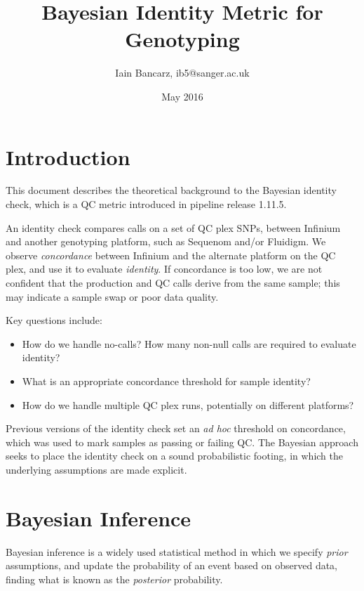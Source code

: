 \documentclass{article}
\begin{document}
\title{Bayesian Identity Metric for Genotyping}
\author{Iain Bancarz, ib5@sanger.ac.uk }
\date{May 2016}
\maketitle


\section{Introduction}

This document describes the theoretical background to the Bayesian identity check, which is a QC metric introduced in pipeline release 1.11.5.

An identity check compares calls on a set of QC plex SNPs, between Infinium and another genotyping platform, such as Sequenom and/or Fluidigm. We observe \emph{concordance} between Infinium and the alternate platform on the QC plex, and use it to evaluate \emph{identity}. If concordance is too low, we are not confident that the production and QC calls derive from the same sample; this may indicate a sample swap or poor data quality.

Key questions include:

\begin{itemize}
\item How do we handle no-calls? How many non-null calls are required to evaluate identity?
\item What is an appropriate concordance threshold for sample identity?
\item How do we handle multiple QC plex runs, potentially on different platforms?
\end{itemize}

Previous versions of the identity check set an \textit{ad hoc} threshold on concordance, which was used to mark samples as passing or failing QC. The Bayesian approach seeks to place the identity check on a sound probabilistic footing, in which the underlying assumptions are made explicit.

\section{Bayesian Inference}

Bayesian inference is a widely used statistical method in which we specify \emph{prior} assumptions, and update the probability of an event based on observed data, finding what is known as the \emph{posterior} probability.
\end{document}
